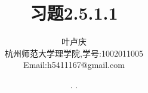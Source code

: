 \documentclass[a4paper, 12pt]{article} %
\makeatletter
\renewcommand{\maketitle}{ %
  \renewcommand\refname{参考文献}
  \newcommand{\D}{\displaystyle}\newcommand{\ri}{\Rightarrow}
  \newcommand{\ds}{\displaystyle} \renewcommand{\ni}{\noindent}
  \newcommand{\pa}{\partial} \newcommand{\Om}{\Omega}
  \newcommand{\om}{\omega} \newcommand{\sik}{\sum_{i=1}^k}
  \newcommand{\vov}{\Vert\omega\Vert} \newcommand{\Umy}{U_{\mu_i,y^i}}
  \newcommand{\lamns}{\lambda_n^{^{\scriptstyle\sigma}}}
  \newcommand{\chiomn}{\chi_{_{\Omega_n}}}
  \newcommand{\ullim}{\underline{\lim}} \newcommand{\bsy}{\boldsymbol}
  \newcommand{\mvb}{\mathversion{bold}} \newcommand{\la}{\lambda}
  \newcommand{\La}{\Lambda} \newcommand{\va}{\varepsilon}
  \newcommand{\be}{\beta} \newcommand{\al}{\alpha}
  \newcommand{\dis}{\displaystyle} \newcommand{\R}{{\mathbb R}}
  \newcommand{\N}{{\mathbb N}} \newcommand{\cF}{{\mathcal F}}
  \newcommand{\gB}{{\mathfrak B}} \newcommand{\eps}{\epsilon}
  \begin{flushright} %
    {\LARGE\@title} %
    
    \vspace{50pt} %
    
    {\large\@author} %
    \\\@date %
    
    \vspace{40pt} %
  \end{flushright}
}
\makeatother
\begin{document}
\title{\textbf{习题2.5.1.1}} 
\author{\small{叶卢庆}\\{\small{杭州师范大学理学院,学号:1002011005}}\\{\small{Email:h5411167@gmail.com}}} %
\renewcommand{\today}{\number\year. \number\month. \number\day}
\date{\today} %



\maketitle %






\end{document}

